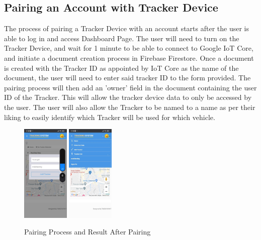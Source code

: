 \documentclass[conference]{IEEEtran}
\begin{document}
\subsection{Pairing an Account with Tracker Device}
The process of pairing a Tracker Device with an account starts after the user is able to log in and access Dashboard Page. The user will need to turn on the Tracker Device, and wait for 
1 minute to be able to connect to Google IoT Core, and initiate a document creation process in Firebase Firestore. Once a document is created with the Tracker ID as appointed by IoT Core as the name of the document, the 
user will need to enter said tracker ID to the form provided. The pairing process will then add an 'owner' field in the document containing the user ID of the Tracker. This will allow the tracker device data to only be accessed 
by the user. The user will also allow the Tracker to be named to a name as per their liking to easily identify which Tracker will be used for which vehicle.
\begin{figure}[htbp]
    \centering
    \includegraphics[width=0.2\textwidth]{pairingsuccess1}
    \includegraphics[width=0.2\textwidth]{pairingsuccess2}
    \caption{Pairing Process and Result After Pairing}
    \label{fig1}
\end{figure}
\end{document}
